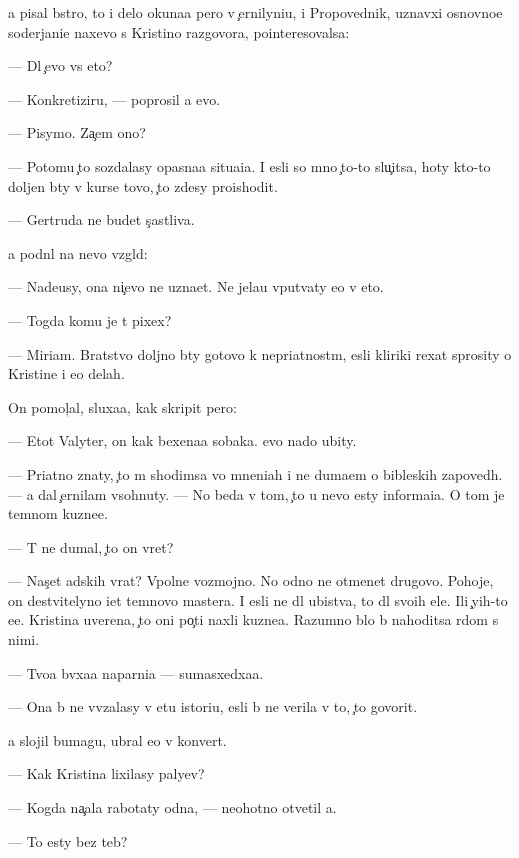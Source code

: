 \documentclass[10pt]{book}
\begin{document}
{\Y}a pisal b{\yi}stro, to i delo okuna{\y}a pero v {\c}ernilyni{\q}u, i Propovednik, uznavxi{\y} osnovno{\y}e soderjani{\y}e naxevo s Kristino{\y} razgovora, po{\y}interesovalsa:

— Dl{\ia} {\c}evo vs{\e} eto?

— Konkretiziru{\y}, — poprosil {\y}a {\y}evo.

— Pisymo. Za{\c}em ono?

— Potomu {\c}to sozdalasy opasna{\y}a situa{\q}i{\y}a. I {\y}esli so mno{\y} {\c}to-to slu{\c}itsa, hoty kto-to doljen b{\yi}ty v kurse tovo, {\c}to zdesy proishodit.

— Gertruda ne budet s{\c}astliva.

{\Y}a podn{\ia}l na nevo vzgl{\ia}d:

— Nade{\y}usy, ona ni{\c}evo ne uzna{\y}et. Ne jela{\y}u vput{\yi}vaty {\y}e{\y}o v eto.

— Togda komu je t{\yi} pixex?

— Miriam. Bratstvo doljno b{\yi}ty gotovo k nepri{\y}atnost{\ia}m, {\y}esli kliriki rexat sprosity o Kristine i {\y}e{\y}o delah.

On pomol{\c}al, sluxa{\y}a, kak skripit pero:

— Etot Valyter, on kak bexena{\y}a sobaka. {\Y}evo nado ubity.

— Pri{\y}atno znaty, {\c}to m{\yi} shodimsa vo mneni{\y}ah i ne duma{\y}em o bible{\y}skih zapoved{\ia}h. — {\Y}a dal {\c}ernilam v{\yi}sohnuty. — No beda v tom, {\c}to u nevo {\y}esty informa{\q}i{\y}a. O tom je temnom kuzne{\q}e.

— T{\yi} ne dumal, {\c}to on vret?

— Nas{\c}et adskih vrat? Vpolne vozmojno. No odno ne otmen{\ia}{\y}et drugovo. Pohoje, on de{\y}stvitelyno i{\x}et temnovo mastera. I {\y}esli ne dl{\ia} ubi{\y}stva, to dl{\ia} svo{\y}ih {\q}ele{\y}. Ili {\c}yih-to {\y}e{\x}e. Kristina uverena, {\c}to oni po{\c}ti naxli kuzne{\q}a. Razumno b{\yi}lo b{\yi} nahoditsa r{\ia}dom s nimi.

— Tvo{\y}a b{\yi}vxa{\y}a naparni{\q}a — sumasxedxa{\y}a.

— Ona b{\yi} ne vv{\ia}zalasy v etu istori{\y}u, {\y}esli b{\yi} ne verila v to, {\c}to govorit.

{\Y}a slojil bumagu, ubral {\y}e{\y}o v konvert.

— Kak Kristina lixilasy paly{\q}ev?

— Kogda na{\c}ala rabotaty odna, — neohotno otvetil {\y}a.

— To {\y}esty bez teb{\ia}?
\end{document}
